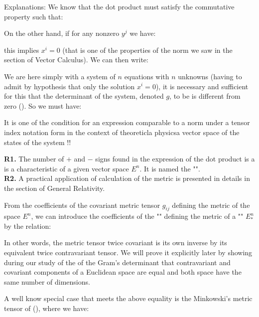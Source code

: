 	Explanations: We know that the dot product must satisfy the commutative property such that:
	
	On the other hand, if for any nonzero $y^j$ we have:
	
	this implies $x^i=0$ (that is one of the properties of the norm we saw in the section of Vector Calculus). We can then write:
	
	We are here simply with a system of $n$ equations with $n$ unknowns (having to admit by hypothesis that only the solution $x^i=0$), it is necessary and sufficient for this that the determinant of the system, denoted $g$, to be is different from zero (). So we must have:
	
	It is one of the condition for an expression comparable to a norm under a tensor index notation form in the context of theoreticla physicsa vector space of the states of the system !!
	
	\begin{tcolorbox}[title=Remarks,colframe=black,arc=10pt]
	\textbf{R1.} The number of $+$ and $-$ signs found in the expression of the dot product is a is a characteristic of a given vector space $E^n$. It is named the "".\\
	
	\textbf{R2.} A practical application of calculation of the metric is presented in details in the section of General Relativity.\\
	\end{tcolorbox}
	From the coefficients of the covariant metric tensor $g_{ij}$ defining the metric of the space $E^n$, we can introduce the coefficients of the "" defining the metric of a "" $E_{*}^n$ by the relation:
	
	In other words, the metric tensor twice covariant is its own inverse by its equivalent twice contravariant tensor. We will prove it explicitly later by showing during our study of the of the Gram's determinant that contravariant and covariant components of a Euclidean space are equal and both space have the same number of dimensions.

	A well know special case that meets the above equality is the Minkowski's metric tensor of (), where we have:
	 
